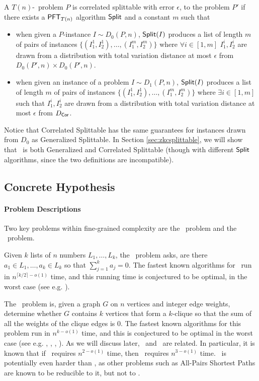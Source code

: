 \begin{definition}\label{def:cor-split}
	A $T(n)$-\ACIH~problem $P$ is correlated splittable with error $\epsilon$, to the problem $P'$ if there exists a $\mathsf{PFT}_{T(n)}$ algorithm $\mathsf{Split}$ and a constant $m$ such that
	\begin{itemize}
		\item when given a $P$-instance $I \sim D_{0}(P,n)$, $\mathsf{Split}(I)$ produces a list of length $m$ of pairs of instances  $\{(I_1^1,I_2^1),\ldots,(I_1^m,I_2^m)\}$ where  $\forall i\in [1,m]$ $I_1^i,I_2^i$ are drawn from a distribution with total variation distance at most $\epsilon$ from $D_{0}(P',n)\times D_0(P',n)$.
		\item when given an instance of a problem $I \sim D_{1}(P,n)$, $\mathsf{Split}(I)$ produces a list of length $m$ of pairs of instances  $\{(I_1^1,I_2^1),\ldots,(I_1^m,I_2^m)\}$ where $\exists i\in[1,m]$ such that $I_1^i,I_2^i$ are drawn from a distribution with total variation distance at most $\epsilon$ from $D_{\mathsf{Cor}}$.
	\end{itemize}
\end{definition}

Notice that Correlated Splittable has the same guarantees for instances drawn from $D_0$ as Generalized Splittable. In Section \ref{sec:zkcsplittable}, we will show that \zkclique~is both Generalized and Correlated Splittable (though with different $\mathsf{Split}$ algorithms, since the two definitions are incompatible).

\subsection {Concrete Hypothesis}

\paragraph{Problem Descriptions}
Two key problems within fine-grained complexity are the \kSum~problem and the \zkclique~problem. 

Given $k$ lists of $n$ numbers $L_1,\ldots,L_k$, the \kSum~problem asks, are there $a_1\in L_1,\ldots, a_k\in L_k$ so that $\sum_{j=1}^k a_j=0$. The fastest known algorithms for \kSum~run in $n^{\lceil k/2\rceil -o(1)}$ time, and this running time is conjectured to be optimal, in the worst case (see e.g. \cite{Patrascu10,AbboudW14pop,icm-survey}). 

The \zkclique~problem is, given a graph $G$ on $n$ vertices and integer edge weights, determine whether $G$ contains $k$ vertices that form a $k$-clique so that the sum of all the weights of the clique edges is $0$. The fastest known algorithms for this problem run in $n^{k-o(1)}$ time, and this is conjectured to be optimal in the worst case (see e.g. \cite{BackursT16}, \cite{abboud2014consequences}, \cite{sparseGraphsLVWW}, \cite{treeEditDistance}). As we will discuss later, \zkclique~and \kSum~are related. In particular, it is known \cite{virgi10} that if \ThSum~requires $n^{2-o(1)}$ time, then \zThclique~requires $n^{3-o(1)}$ time. \zThclique~is potentially even harder than \ThSum, as other problems such as All-Pairs Shortest Paths are known to be reducible to it, but not to \ThSum.


